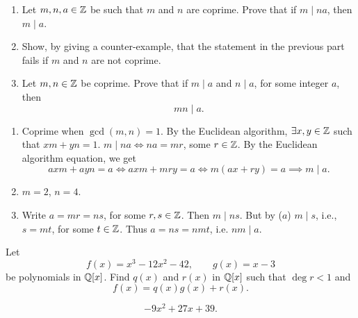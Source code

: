 \documentclass[10pt, a4paper]{article}
\begin{document}
\begin{problem}[Question $17$]
    \begin{enumerate}[label = (\alph*)]
        \item Let $m, n, a \in \mathbb{Z}$ be such that $m$ and $n$ are coprime.
        Prove that if $m \mid na$,
        then $m \mid a$.

        \item Show,
        by giving a counter-example,
        that the statement in the previous part fails if $m$ and $n$ are not coprime.

        \item Let $m, n \in \mathbb{Z}$ be coprime.
        Prove that if $m \mid a$ and $n \mid a$,
        for some integer $a$,
        then
        \[
        mn \mid a.
        \]
    \end{enumerate}

    \begin{solution}
        \begin{enumerate}[label = (\alph*)]
            \item
            Coprime when $\gcd(m, n) = 1$.
            By the Euclidean algorithm,
            $\exists x, y \in \mathbb{Z}$ such that $xm + yn = 1$.
            $m \mid na \iff na = mr$,
            some $r \in \mathbb{Z}$.
            By the Euclidean algorithm equation,
            we get
            \[
            axm + ayn = a \iff axm + mry = a \iff m(ax + ry) = a \implies m \mid a.
            \]

            \item $m = 2$,
            $n = 4$.

            \item
            Write $a = mr = ns$,
            for some $r, s \in \mathbb{Z}$.
            Then $m \mid ns$.
            But by ($a$)
            $m \mid s$,
            i.e.,
            $s = mt$,
            for some $t \in \mathbb{Z}$.
            Thus $a = ns = nmt$,
            i.e. $nm \mid a$.
        \end{enumerate}
    \end{solution}
\end{problem}

\begin{problem}[Question $21$]
    Let
    \[
    f(x) = x ^ 3 - 12x ^ 2 - 42,\qquad g(x) = x - 3
    \]
    be polynomials in $\mathbb{Q}[x]$.
    Find $q(x)$ and $r(x)$ in $\mathbb{Q}[x]$ such that $\deg{r} < 1$ and
    \[
    f(x) = q(x)g(x) + r(x).
    \]

    \begin{solution}
        \[
        -9x ^ 2 + 27x +39.
        \]
    \end{solution}
\end{problem}
\end{document}
